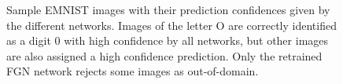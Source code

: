\documentclass[12pt,oneside]{CUNY_PhD}
\begin{document}
\begin{figure}[!t]
    \centering
    \caption{Sample EMNIST images with their prediction confidences given by the different networks. Images of the letter O are correctly identified as a digit 0 with high confidence by all networks, but other images are also assigned a high confidence prediction. Only the retrained FGN network rejects some images as out-of-domain.}
    \label{fig:pred-letters}
\end{figure}
\newpage %
\end{document}
